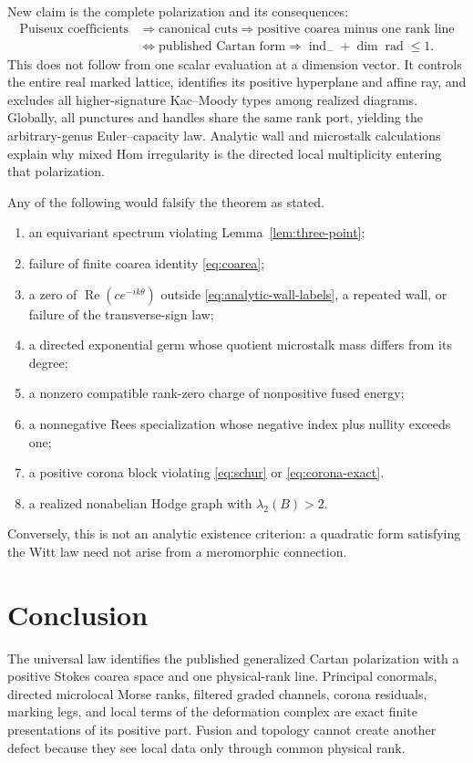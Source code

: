 \documentclass[11pt,a4paper]{amsart}
\theoremstyle{plain}
\theoremstyle{definition}
\newcommand{\indm}{\operatorname{ind}_{-}}
\newcommand{\Rad}{\operatorname{rad}}
\begin{document}
New claim is the complete polarization and its consequences:
\begin{align*}
 \text{Puiseux coefficients}&\Longrightarrow\text{canonical cuts}
 \Longrightarrow\text{positive coarea minus one rank line}\\
 &\Longleftrightarrow\text{published Cartan form}
 \Longrightarrow \indm+\dim\Rad\leq1.
\end{align*}
This does not follow from one scalar evaluation at a dimension vector.  It controls the entire
real marked lattice, identifies its positive hyperplane and affine ray, and excludes all
higher-signature Kac--Moody types among realized diagrams.  Globally, all punctures and handles
share the same rank port, yielding the arbitrary-genus Euler--capacity law.  Analytic wall and
microstalk calculations explain why mixed Hom irregularity is the directed local multiplicity
entering that polarization.

Any of the following would falsify the theorem as stated.
\begin{enumerate}[label=(\arabic*),leftmargin=2.2em]
\item an equivariant spectrum violating Lemma~\ref{lem:three-point};
\item failure of finite coarea identity \eqref{eq:coarea};
\item a zero of $\operatorname{Re}(ce^{-ik\theta})$ outside
      \eqref{eq:analytic-wall-labels}, a repeated wall, or failure of the transverse-sign law;
\item a directed exponential germ whose quotient microstalk mass differs from its degree;
\item a nonzero compatible rank-zero charge of nonpositive fused energy;
\item a nonnegative Rees specialization whose negative index plus nullity exceeds one;
\item a positive corona block violating \eqref{eq:schur} or \eqref{eq:corona-exact}.
\item a realized nonabelian Hodge graph with $\lambda_2(B)>2$.
\end{enumerate}
Conversely, this is not an analytic existence criterion: a quadratic form satisfying the Witt law
need not arise from a meromorphic connection.

\section{Conclusion}

The universal law identifies the published generalized Cartan polarization with a positive Stokes
coarea space and one physical-rank line.  Principal conormals, directed microlocal Morse ranks,
filtered graded channels, corona residuals, marking legs, and local terms of the deformation
complex are exact finite presentations of its positive part.  Fusion and topology cannot create
another defect because they see local data only through common physical rank.
\end{document}
